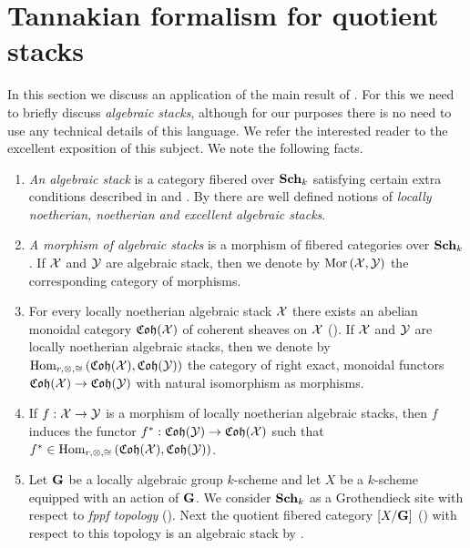 \section{Tannakian formalism for quotient stacks}
\noindent
In this section we discuss an application of the main result of \cite{hall2019}. For this we need to briefly discuss \textit{algebraic stacks}, although for our purposes there is no need to use any technical details of this language. We refer the interested reader to the excellent exposition \cite{olsson2016algebraic} of this subject. We note the following facts.
\begin{enumerate}[label=\textbf{(\arabic*)}, leftmargin=3.0em]
\item \textit{An algebraic stack} is a category fibered over $\mathbf{Sch}_k$ satisfying certain extra conditions described in {\cite[Definition 4.6.1]{olsson2016algebraic}} and {\cite[Definition 8.1.4]{olsson2016algebraic}}. By  {\cite[Definition 8.2.1, Example 8.2.3]{olsson2016algebraic}} there are well defined notions of \textit{locally noetherian, noetherian and excellent algebraic stacks}. 
\item \textit{A morphism of algebraic stacks} is a morphism of fibered categories over $\mathbf{Sch}_k$. If ${\mathcal X}$ and ${\mathcal Y}$ are algebraic stack, then we denote by $\mathrm{Mor}\left({\mathcal X},{\mathcal Y}\right)$ the corresponding category of morphisms.
\item For every locally noetherian algebraic stack ${\mathcal X}$ there exists an abelian monoidal category $\mathfrak{Coh}({\mathcal X})$ of coherent sheaves on ${\mathcal X}$ ({\cite[Definition 9.1.14]{olsson2016algebraic}}). If ${\mathcal X}$ and ${\mathcal Y}$ are locally noetherian algebraic stacks, then we denote by $\mathrm{Hom}_{r,\otimes,\cong}\left(\mathfrak{Coh}({\mathcal X}),\mathfrak{Coh}({\mathcal Y})\right)$ the category of right exact, monoidal functors $\mathfrak{Coh}({\mathcal X})\rightarrow \mathfrak{Coh}({\mathcal Y})$ with natural isomorphism as morphisms.
\item If $f:{\mathcal X}\rightarrow {\mathcal Y}$ is a morphism of locally noetherian algebraic stacks, then $f$ induces the functor $f^*:\mathfrak{Coh}({\mathcal Y})\rightarrow \mathfrak{Coh}({\mathcal X})$ such that $f^*\in \mathrm{Hom}_{r,\otimes,\cong}\left(\mathfrak{Coh}({\mathcal X}),\mathfrak{Coh}({\mathcal Y})\right)$.
\item Let $\mathbf{G}$ be a locally algebraic group $k$-scheme and let $X$ be a $k$-scheme equipped with an action of $\mathbf{G}$. We consider $\mathbf{Sch}_k$ as a Grothendieck site with respect to \textit{fppf topology} ({\cite[Example 2.1.14]{olsson2016algebraic}}). Next the quotient fibered category $[X/\mathbf{G}]$ ({\cite[Definition 9.5]{Fibered_categories_and_equivariant_objects}}) with respect to this topology is an algebraic stack by {\cite[Example 8.1.12]{olsson2016algebraic}}.

\end{enumerate}
